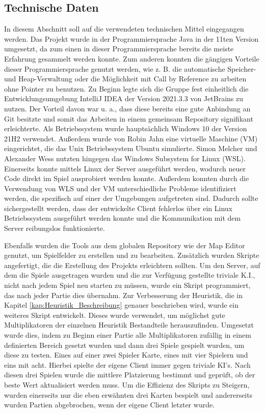 \documentclass[12pt,a4paper,bibliography=totocnumbered,listof=totocnumbered]{article}
\begin{document}
\subsection{Technische Daten}
In diesem Abschnitt soll auf die verwendeten technischen Mittel eingegangen werden. Das Projekt wurde in der Programmiersprache Java in der 11ten Version umgesetzt, da zum einen in dieser Programmiersprache bereits die meiste Erfahrung gesammelt werden konnte. Zum anderen konnten die gängigen Vorteile dieser Programmiersprache genutzt werden, wie z. B. die automatische Speicher- und Heap-Verwaltung oder die Möglichkeit mit \glqq Call by Reference\grqq{} zu arbeiten ohne Pointer zu benutzen.
Zu Beginn legte sich die Gruppe fest einheitlich die Entwicklungsumgebung IntelliJ IDEA der Version 2021.3.3 von JetBrains zu nutzen. Der Vorteil davon war u. a., dass diese bereits eine gute Anbindung an Git besitzte und somit das Arbeiten in einem gemeinsam Repository signifikant erleichterte.
Als Betriebssystem wurde hauptsächlich Windows 10 der Version 21H2 verwendet. Außerdem wurde von Robin Jahn eine virtuelle Maschine (VM) eingerichtet, die das Unix Betriebssystem Ubuntu simulierte. Simon Melcher und Alexander Wess nutzten hingegen das Windows Subsystem for Linux (WSL). Einerseits konnte mittels Linux der Server ausgeführt werden, wodurch neuer Code direkt im Spiel ausprobiert werden konnte. Außerdem konnten durch die Verwendung von WLS und der VM unterschiedliche Probleme identifiziert werden, die spezifisch auf einer der Umgebungen aufgetreten sind. Dadurch sollte sichergestellt werden, dass der entwickelte Client fehlerlos über ein Linux Betriebssystem ausgeführt werden konnte und die Kommunikation mit dem Server reibungslos funktionierte.

Ebenfalls wurden die Tools aus dem globalen Repository wie der Map Editor genutzt, um Spielfelder zu erstellen und zu bearbeiten. Zusätzlich wurden Skripte angefertigt, die die Erstellung des Projekts erleichtern sollten. Um den Server, auf dem die Spiele ausgetragen wurden und die zur Verfügung gestellte triviale K.I., nicht nach jedem Spiel neu starten zu müssen, wurde ein Skript programmiert, das nach jeder Partie dies übernahm. Zur Verbesserung der Heuristik, die in Kapitel \ref{kap:Heuristik_Beschreibung} genauer beschrieben wird, wurde ein weiteres Skript entwickelt. Dieses wurde verwendet, um möglichst gute Multiplikatoren der einzelnen Heuristik Bestandteile herauszufinden. Umgesetzt wurde dies, indem zu Beginn einer Partie alle Multiplikatoren zufällig in einem definierten Bereich gesetzt wurden und dann drei Spiele gespielt wurden, um diese zu testen. Eines auf einer zwei Spieler Karte, eines mit vier Spielern und eins mit acht. Hierbei spielte der eigene Client immer gegen triviale KI's. Nach diesen drei Spielen wurde die mittlere Platzierung bestimmt und geprüft, ob der beste Wert aktualisiert werden muss. Um die Effizienz des Skripts zu Steigern, wurden einerseits nur die eben erwähnten drei Karten bespielt und andererseits wurden Partien abgebrochen, wenn der eigene Client letzter wurde.
\end{document}
